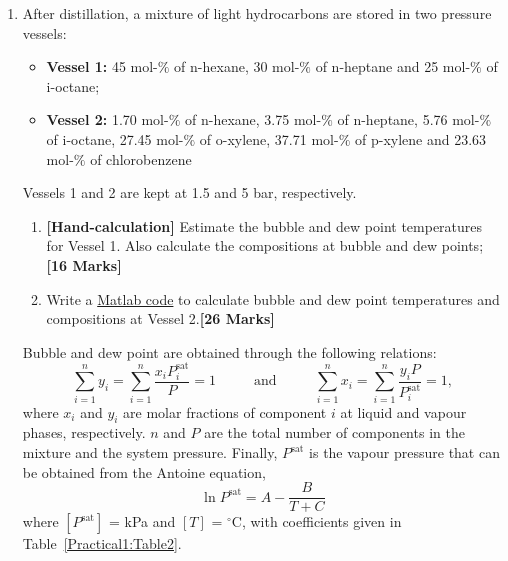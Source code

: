 \documentclass[12pts,a4paper,amsmath,amssymb,floatfix]{article}%
\newcommand{\frc}{\displaystyle\frac}
\begin{document}
\begin{enumerate}[label=\bfseries Problem \arabic*:]
     \item After distillation, a mixture of light hydrocarbons are stored in two pressure vessels:
         \begin{itemize}
            \item {\bf Vessel 1:} 45 mol-$\%$ of n-hexane, 30 mol-$\%$ of n-heptane and 25 mol-$\%$ of i-octane;
            \item {\bf Vessel 2:} 1.70 mol-$\%$ of n-hexane, 3.75 mol-$\%$ of n-heptane, 5.76 mol-$\%$ of i-octane, 27.45 mol-$\%$ of o-xylene, 37.71 mol-$\%$ of p-xylene and 23.63 mol-$\%$ of chlorobenzene 
         \end{itemize} 
         Vessels 1 and 2 are kept at 1.5 and 5 bar, respectively.
          \begin{enumerate}[label=\bfseries Task \arabic*]
              \item\label{e} {\bf[Hand-calculation]} Estimate the bubble and dew point temperatures for Vessel 1. Also calculate the compositions at bubble and dew points; \hfill{\bf[16 Marks]}
              \item\label{f} Write a \underline{Matlab code} to calculate bubble and dew point temperatures and compositions at Vessel 2.\hfill{\bf[26 Marks]}
          \end{enumerate}

          Bubble and dew point are obtained through the following relations:
          \begin{displaymath}
             \sum\limits_{i=1}^{n} y_{i} = \sum\limits_{i=1}^{n} \frc{x_{i}P_{i}^{\text{sat}}}{P} = 1 \hspace{1cm}\text{ and } \hspace{1cm} \sum\limits_{i=1}^{n} x_{i} = \sum\limits_{i=1}^{n} \frc{y_{i}P}{P_{i}^{\text{sat}}} = 1,
          \end{displaymath}
          where $x_{i}$ and $y_{i}$ are molar fractions of component $i$ at liquid and vapour phases, respectively. $n$ and $P$ are the total number of components in the mixture and the system pressure. Finally, $P^{\text{sat}}$ is the vapour pressure that can be obtained from the Antoine equation,
          \begin{displaymath}
            \ln{P^{\text{sat}}} = A - \frc{B}{T+C}
          \end{displaymath}
          where $\left[P^{\text{sat}}\right]$ = kPa and $[T]$ = $^{\circ}$C, with coefficients given in Table~\ref{Practical1:Table2}.
           


\end{enumerate}
\end{document}
